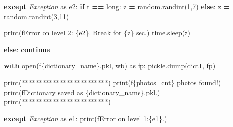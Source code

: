 \documentclass[
]{article}
\newenvironment{Shaded}{\begin{snugshade}}{\end{snugshade}}
\newcommand{\BuiltInTok}[1]{#1}
\newcommand{\ControlFlowTok}[1]{\textcolor[rgb]{0.13,0.29,0.53}{\textbf{#1}}}
\newcommand{\DecValTok}[1]{\textcolor[rgb]{0.00,0.00,0.81}{#1}}
\newcommand{\ImportTok}[1]{#1}
\newcommand{\NormalTok}[1]{#1}
\newcommand{\OperatorTok}[1]{\textcolor[rgb]{0.81,0.36,0.00}{\textbf{#1}}}
\newcommand{\PreprocessorTok}[1]{\textcolor[rgb]{0.56,0.35,0.01}{\textit{#1}}}
\newcommand{\SpecialCharTok}[1]{\textcolor[rgb]{0.00,0.00,0.00}{#1}}
\newcommand{\SpecialStringTok}[1]{\textcolor[rgb]{0.31,0.60,0.02}{#1}}
\newcommand{\StringTok}[1]{\textcolor[rgb]{0.31,0.60,0.02}{#1}}
\begin{document}
\begin{Shaded}
\begin{Highlighting}[]
                \ControlFlowTok{except} \PreprocessorTok{Exception} \ImportTok{as}\NormalTok{ e2:}
                    \ControlFlowTok{if}\NormalTok{ t }\OperatorTok{==} \StringTok{\textquotesingle{}long\textquotesingle{}}\NormalTok{:}
\NormalTok{                        z }\OperatorTok{=}\NormalTok{ random.randint(}\DecValTok{1}\NormalTok{,}\DecValTok{7}\NormalTok{)}
                    \ControlFlowTok{else}\NormalTok{:}
\NormalTok{                        z }\OperatorTok{=}\NormalTok{ random.randint(}\DecValTok{3}\NormalTok{,}\DecValTok{11}\NormalTok{)}

                    \BuiltInTok{print}\NormalTok{(}\SpecialStringTok{f\textquotesingle{}Error on level 2: }\SpecialCharTok{\{}\NormalTok{e2}\SpecialCharTok{\}}\SpecialStringTok{. Break for }\SpecialCharTok{\{}\NormalTok{z}\SpecialCharTok{\}}\SpecialStringTok{ sec.\textquotesingle{}}\NormalTok{)}
\NormalTok{                    time.sleep(z)}

            \ControlFlowTok{else}\NormalTok{:}
                \ControlFlowTok{continue}

        \ControlFlowTok{with} \BuiltInTok{open}\NormalTok{(}\SpecialStringTok{f\textquotesingle{}}\SpecialCharTok{\{}\NormalTok{dictionary\_name}\SpecialCharTok{\}}\SpecialStringTok{.pkl\textquotesingle{}}\NormalTok{, }\StringTok{\textquotesingle{}wb\textquotesingle{}}\NormalTok{) }\ImportTok{as}\NormalTok{ fp:}
\NormalTok{            pickle.dump(dict1, fp)}

        \BuiltInTok{print}\NormalTok{(}\StringTok{\textquotesingle{}*************************\textquotesingle{}}\NormalTok{)}
        \BuiltInTok{print}\NormalTok{(}\SpecialStringTok{f\textquotesingle{}}\SpecialCharTok{\{}\NormalTok{photos\_cnt}\SpecialCharTok{\}}\SpecialStringTok{ photos found!\textquotesingle{}}\NormalTok{)}
        \BuiltInTok{print}\NormalTok{(}\SpecialStringTok{f\textquotesingle{}Dictionary saved as }\SpecialCharTok{\{}\NormalTok{dictionary\_name}\SpecialCharTok{\}}\SpecialStringTok{.pkl.\textquotesingle{}}\NormalTok{)}
        \BuiltInTok{print}\NormalTok{(}\StringTok{\textquotesingle{}*************************\textquotesingle{}}\NormalTok{)}

    \ControlFlowTok{except} \PreprocessorTok{Exception} \ImportTok{as}\NormalTok{ e1:}
        \BuiltInTok{print}\NormalTok{(}\SpecialStringTok{f\textquotesingle{}Error on level 1:}\SpecialCharTok{\{}\NormalTok{e1}\SpecialCharTok{\}}\SpecialStringTok{.\textquotesingle{}}\NormalTok{)}
\end{Highlighting}
\end{Shaded}
\end{document}
